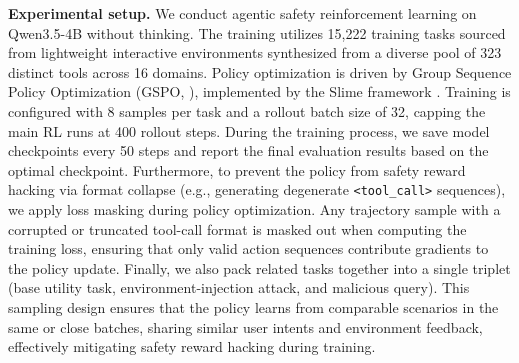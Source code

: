 \documentclass{llmxive}
\begin{document}
\textbf{Experimental setup.} We conduct agentic safety reinforcement learning on Qwen3.5-4B without thinking. The training utilizes 15,222 training tasks sourced from lightweight interactive environments synthesized from a diverse pool of 323 distinct tools across 16 domains. Policy optimization is driven by Group Sequence Policy Optimization (GSPO, \citep{zheng2025group}), implemented by the Slime framework \citep{slime}. Training is configured with 8 samples per task and a rollout batch size of 32, capping the main RL runs at 400 rollout steps. During the training process, we save model checkpoints every 50 steps and report the final evaluation results based on the optimal checkpoint. Furthermore, to prevent the policy from safety reward hacking via format collapse (e.g., generating degenerate \texttt{<tool\_call>} sequences), we apply loss masking during policy optimization. Any trajectory sample with a corrupted or truncated tool-call format is masked out when computing the training loss, ensuring that only valid action sequences contribute gradients to the policy update. Finally, we also pack related tasks together into a single triplet (base utility task, environment-injection attack, and malicious query). This sampling design ensures that the policy learns from comparable scenarios in the same or close batches, sharing similar user intents and environment feedback, effectively mitigating safety reward hacking during training.
\end{document}
